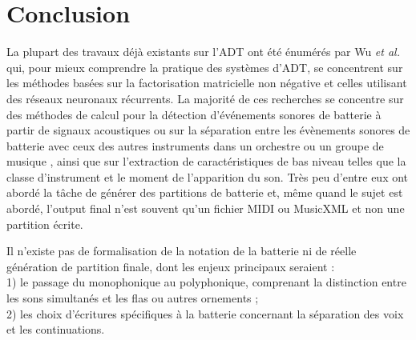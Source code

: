 \section*{Conclusion}
La plupart des travaux déjà existants sur l’ADT ont été énumérés par Wu \textit{et al.} \cite{Review_ADT} qui, 
pour mieux comprendre la pratique des systèmes d’ADT, se concentrent sur les méthodes basées sur la factorisation matricielle non négative et celles utilisant des réseaux neuronaux récurrents. 
La majorité de ces recherches se concentre sur des méthodes de calcul pour la détection d'événements sonores de batterie à partir de signaux acoustiques ou sur la séparation entre les évènements sonores de batterie avec ceux des autres instruments dans un orchestre ou un groupe de musique \cite{2802}, ainsi que sur l'extraction de caractéristiques de bas niveau telles que la classe d'instrument et le moment de l'apparition du son. 
Très peu d'entre eux ont abordé la tâche de générer des partitions de batterie et, même quand le sujet est abordé, l’output final n’est souvent qu’un fichier MIDI ou MusicXML et non une partition écrite.

Il n’existe pas de formalisation de la notation de la batterie ni de réelle génération de partition finale, 
dont les enjeux principaux seraient :\\1) le passage du monophonique au polyphonique, comprenant la distinction entre les sons simultanés et les flas ou autres ornements ;\\2) les choix d’écritures spécifiques à la batterie concernant la séparation des voix et les continuations.
